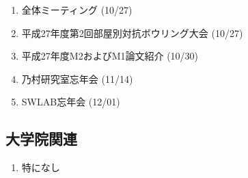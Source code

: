 \documentclass[fleqn, 14pt]{extarticle}
\begin{document}
    \begin{enumerate}

        \item 全体ミーティング
            \hfill
            \label{enum-18}
            (10/27)

        \item 平成27年度第2回部屋別対抗ボウリング大会
            \hfill
            \label{enum-18}
            (10/27)

        \item 平成27年度M2およびM1論文紹介
            \hfill
            \label{enum-18}
            (10/30)

        \item 乃村研究室忘年会
            \hfill
            \label{enum-18}
            (11/14)

        \item SWLAB忘年会
            \hfill
            \label{enum-18}
            (12/01)

    \end{enumerate}

    \subsection{大学院関連}
    \begin{enumerate}

        \item 特になし
            \hfill
            \label{enum-17}

    \end{enumerate}

    
\end{document}
